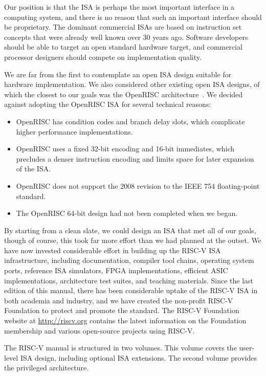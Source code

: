 \begin{commentary}
Our position is that the ISA is perhaps the most important interface
in a computing system, and there is no reason that such an important
interface should be proprietary.  The dominant commercial ISAs are
based on instruction set concepts that were already well known over 30
years ago.  Software developers should be able to target an open
standard hardware target, and commercial processor designers should
compete on implementation quality.

We are far from the first to contemplate an open ISA design suitable
for hardware implementation.  We also considered other existing open
ISA designs, of which the closest to our goals was the OpenRISC
architecture~\cite{openriscarch}.  We decided against adopting the
OpenRISC ISA for several technical reasons:

\begin{itemize}
\item OpenRISC has condition codes and branch delay slots, which
  complicate higher performance implementations.
\item OpenRISC uses a fixed 32-bit encoding and 16-bit immediates,
  which precludes a denser instruction encoding and limits space for
  later expansion of the ISA.
\item OpenRISC does not support the 2008 revision to the IEEE 754
  floating-point standard.
\item The OpenRISC 64-bit design had not been completed when we began.
\end{itemize}

By starting from a clean slate, we could design an ISA that met all of
our goals, though of course, this took far more effort than we had
planned at the outset.  We have now invested considerable effort in
building up the RISC-V ISA infrastructure, including documentation,
compiler tool chains, operating system ports, reference ISA
simulators, FPGA implementations, efficient ASIC implementations,
architecture test suites, and teaching materials. Since the last
edition of this manual, there has been considerable uptake of the
RISC-V ISA in both academia and industry, and we have created the
non-profit RISC-V Foundation to protect and promote the standard.  The
RISC-V Foundation website at \url{http://riscv.org} contains the latest
information on the Foundation membership and various open-source
projects using RISC-V.
\end{commentary}

The RISC-V manual is structured in two volumes.  This volume covers
the user-level ISA design, including optional ISA extensions.  The
second volume provides the privileged architecture.

